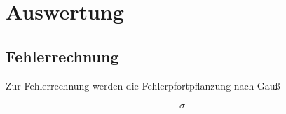 \section{Auswertung}
\label{sec:Auswertung}

\subsection{Fehlerrechnung}
  Zur Fehlerrechnung werden die Fehlerpfortpflanzung nach Gauß

  \begin{align}
    \sigma
  \end{align}

